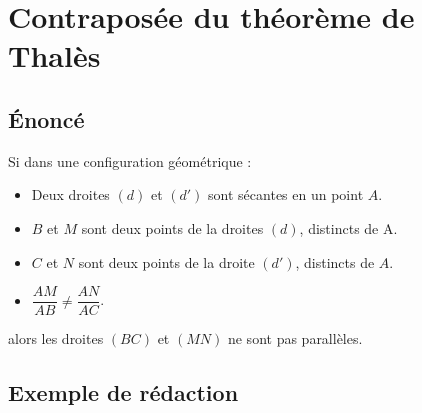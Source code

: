 \section{Contraposée du théorème de Thalès}
    \subsection{Énoncé}
        \begin{theoreme}[\admis]
            Si dans une configuration géométrique :
            \begin{itemize}
                \item Deux droites $(d)$ et $(d')$ sont sécantes en un point $A$.
                \item $B$ et $M$ sont deux points de la droites $(d)$, distincts de A.
                \item $C$ et $N$ sont deux points de la droite $(d')$, distincts de $A$.
                \item $\dfrac{AM}{AB} \neq \dfrac{AN}{AC}$.       
            \end{itemize}
            \medskip
            alors les droites $(BC)$ et $(MN)$ ne sont pas parallèles.
        \end{theoreme}

    \subsection{Exemple de rédaction}

